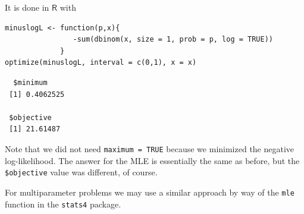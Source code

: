 \documentclass[captions=tableheading]{scrbook}
\begin{document}
It is done in \(\mathsf{R}\) with


\begin{verbatim}
minuslogL <- function(p,x){
                -sum(dbinom(x, size = 1, prob = p, log = TRUE))
             }
optimize(minuslogL, interval = c(0,1), x = x)
\end{verbatim}

\begin{verbatim}
  $minimum
 [1] 0.4062525
 
 $objective
 [1] 21.61487
\end{verbatim}

Note that we did not need \texttt{maximum = TRUE} because we minimized the negative log-likelihood. The answer for the MLE is essentially the same as before, but the \texttt{\$objective} value was different, of course.

For multiparameter problems we may use a similar approach by way of the \texttt{mle} function in the \texttt{stats4} package. 
\end{document}
